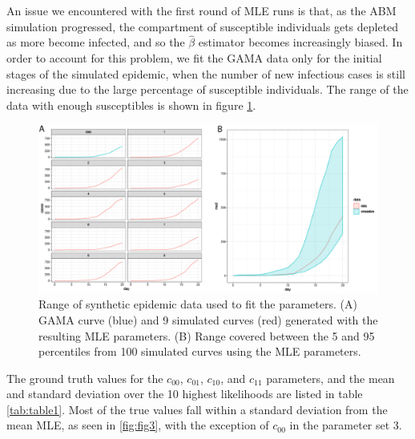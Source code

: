 \documentclass{article}
\begin{document}
An issue we encountered with the first round of MLE runs is that, as the ABM simulation progressed, the compartment of susceptible individuals gets depleted as more become infected, and so the $\hat{\beta}$ estimator becomes increasingly biased. In order to account for this problem, we fit the GAMA data only for the initial stages of the simulated epidemic, when the number of new infectious cases is still increasing due to the large percentage of susceptible individuals. The range of the data with enough susceptibles is shown in figure \ref{fig:fig2}.

\begin{figure} %
  \centering
  \includegraphics[scale=0.4]{Figure-2.png}
  \caption{Range of synthetic epidemic data used to fit the parameters. (A) GAMA curve (blue) and 9 simulated curves (red) generated with the resulting MLE parameters. (B) Range covered between the 5 and 95 percentiles from 100 simulated curves using the MLE parameters. }
  \label{fig:fig2}
\end{figure}

The ground truth values for the $c_{00}$, $c_{01}$, $c_{10}$, and $c_{11}$ parameters, and the mean and standard deviation over the 10 highest likelihoods are listed in table \ref{tab:table1}. Most of the true values fall within a standard deviation from the mean MLE, as seen in \ref{fig:fig3}, with the exception of $c_{00}$ in the parameter set 3.
\end{document}
